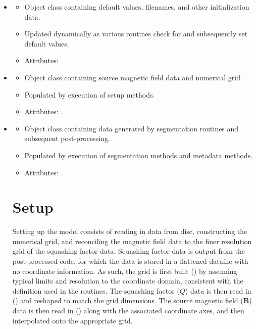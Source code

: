 \documentclass[10pt]{aastex62}
\begin{document}
\begin{itemize}

\item{ \begin{itemize}
\item{Object class containing default values, filenames, and other initialization data.}
\item{Updated dynamically as various routines check for and subsequently set default values.}
\item{Attributes: }
\end{itemize}
}

\item{\begin{itemize}
\item{Object class containing source magnetic field data and numerical grid.}
\item{Populated by execution of setup methods.}
\item{Attributes: .}
\end{itemize}
}

\item{\begin{itemize}
\item{Object class containing data generated by segmentation routines and subsequent post-processing.}
\item{Populated by execution of segmentation methods and metadata methods.}
\item{Attributes: .}
\end{itemize}
}

\section{Setup}

Setting up the model consists of reading in data from disc, constructing the numerical grid, and reconciling the magnetic field data to the finer resolution grid of the squashing factor data.
Squashing factor data is output from the post-processed  code, for which the data is stored in a flattened datafile with no coordinate information.
As such, the grid is first built () by assuming typical limits and resolution to the coordinate domain, consistent with the definition used in the  routines.
The squashing factor ($Q$) data is then read in () and reshaped to match the grid dimensions.
The source magnetic field ($\bm{B}$) data is then read in () along with the associated coordinate axes, and then interpolated onto the appropriate grid.


\end{itemize}
\end{document}
